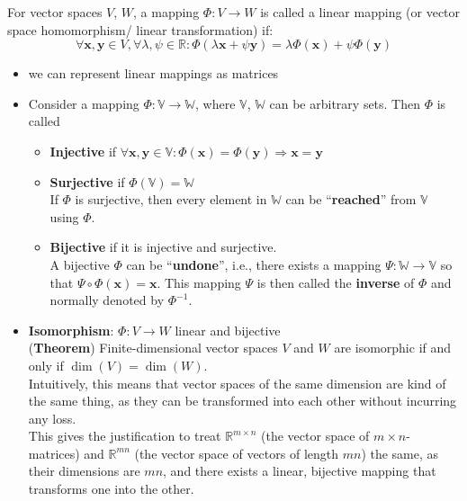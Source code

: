 For vector spaces $V$, $W$, a mapping $\Phi : V \rightarrow W$ is called a linear mapping (or vector space homomorphism/ linear transformation) if:
\[
    \forall \mathbf{x, y} \in V, \forall\lambda, \psi \in \mathbb{R} : \Phi(\lambda\mathbf{x} + \psi\mathbf{y}) = \lambda\Phi(\mathbf{x}) + \psi\Phi(\mathbf{y})
\]

\begin{itemize}
    \item we can represent linear mappings as matrices
    \item Consider a mapping $\Phi : \mathbb{V} \rightarrow \mathbb{W}$, where $\mathbb{V}$, $\mathbb{W}$ can be arbitrary sets. Then $\Phi$ is called
    \begin{itemize}
        \item \textbf{Injective} if $\forall \mathbf{x, y} \in \mathbb{V}: \Phi(\mathbf{x}) = \Phi(\mathbf{y}) \Rightarrow \mathbf{x} = \mathbf{y}$ 

        \item \textbf{Surjective} if $\Phi(\mathbb{V}) = \mathbb{W}$\\
        If $\Phi$ is surjective, then every element in $\mathbb{W}$ can be “\textbf{reached}” from $\mathbb{V}$ using $\Phi$.

        \item \textbf{Bijective} if it is injective and surjective.\\
        A bijective $\Phi$ can be “\textbf{undone}”, i.e., there exists a mapping $\Psi : \mathbb{W} \rightarrow \mathbb{V}$ so that $\Psi \circ \Phi(\textbf{x}) = \textbf{x}$. This mapping $\Psi$ is then called the \textbf{inverse} of $\Phi$ and normally denoted by $\Phi^{-1}$.
        
    \end{itemize}

    \item \textbf{Isomorphism}: $\Phi : V \rightarrow W$ linear and bijective\\
    (\textbf{Theorem}) Finite-dimensional vector spaces $V$ and $W$ are isomorphic if and only if $\dim(V) = \dim(W)$.\\
    Intuitively, this means that vector spaces of the same dimension are kind of the same thing, as they can be transformed into each other without incurring any loss.\\
    This gives the justification to treat $\mathbb{R}^{m\times n}$ (the vector space of ${m\times n}$-matrices) and $\mathbb{R}^{mn}$ (the vector space of vectors of length $mn$) the same, as their dimensions are $mn$, and there exists a linear, bijective mapping that transforms one into the other.


\end{itemize}
